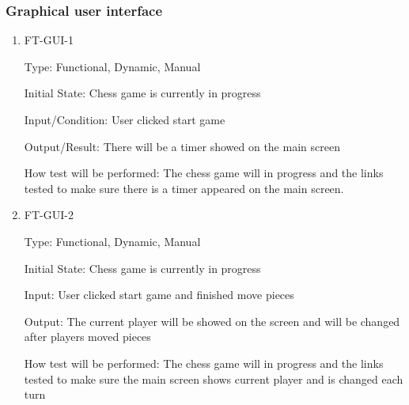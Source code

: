 \documentclass[12pt, titlepage]{article}
\begin{document}
\subsubsection{Graphical user interface}

\begin{enumerate}

\item{FT-GUI-1\\}

Type: Functional, Dynamic, Manual
					
Initial State: Chess game is currently in progress
					
Input/Condition: User clicked start game
					
Output/Result: There will be a timer showed on the main screen
					
How test will be performed: The chess game will in progress and the links tested to make sure there is a timer appeared on the main screen. 

\item{FT-GUI-2\\}

Type: Functional, Dynamic, Manual
					
Initial State: Chess game is currently in progress
					
Input: User clicked start game and finished move pieces
					
Output: The current player will be showed on the screen and will be changed after players moved pieces
					
How test will be performed: The chess game will in progress and the links tested to make sure the main screen shows current player and is changed each turn


\end{enumerate}
\end{document}
